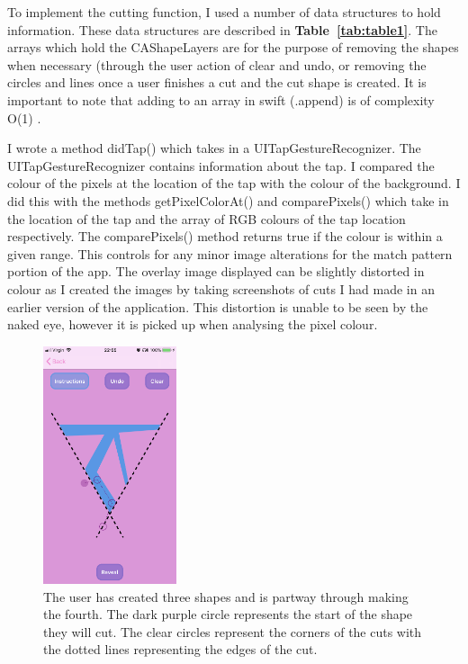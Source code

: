 \documentclass[11pt]{article}
\begin{document}
                 To implement the cutting function, I used a number of data structures to hold information. These data structures are described in \textbf{Table~\ref{tab:table1}}. The arrays which hold the CAShapeLayers are for the purpose of removing the shapes when necessary (through the user action of clear and undo, or removing the circles and lines once a user finishes a cut and the cut shape is created. It is important to note that adding to an array in swift (.append) is of complexity O(1) \cite{O1}.
                 
                 I wrote a method didTap() which takes in a UITapGestureRecognizer. The UITapGestureRecognizer contains information about the tap. I compared the colour of the pixels at the location of the tap with the colour of the background. I did this with the methods getPixelColorAt() and comparePixels() which take in the location of the tap and the array of RGB colours of the tap location respectively. The comparePixels() method returns true if the colour is within a given range. This controls for any minor image alterations for the match pattern portion of the app. The overlay image displayed can be slightly distorted in colour as I created the images by taking screenshots of cuts I had made in an earlier version of the application. This distortion is unable to be seen by the naked eye, however it is picked up when analysing the pixel colour. 
                 
                 
                  \begin{figure}
                        \centering
                        \includegraphics[width=0.35\textwidth]{KiriZen/createPattern}
                        \caption{The user has created three shapes and is partway through making the fourth. The dark purple circle represents the start of the shape they will cut. The clear circles represent the corners of the cuts with the dotted lines representing the edges of the cut.}
                        \label{fig:kiriZen-createPattern}
                    \end{figure}
                    
\end{document}
